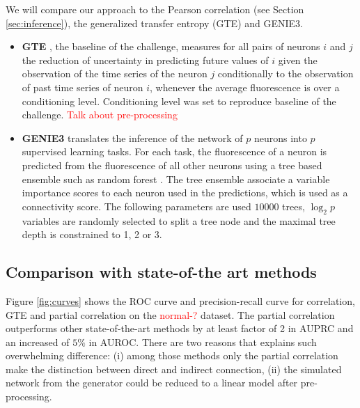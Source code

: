 \documentclass[wcp]{jmlr}
\begin{document}
We will compare our approach to the Pearson correlation (see Section
\ref{sec:inference}), the generalized transfer entropy (GTE) and GENIE3.
\begin{itemize}
\item \textbf{GTE} \citep{stetter2012model}
, the baseline of the challenge, measures for all pairs of
neurons $i$ and $j$ the reduction of uncertainty in predicting future values of
$i$ given the observation of the time series of the neuron $j$
conditionally to the observation of past time series of neuron $i$,
whenever the average fluorescence is over a conditioning level.
Conditioning level was set to reproduce baseline of the challenge.
\textcolor{red}{Talk about pre-processing}

\item \textbf{GENIE3} \citep{huynhthu2010inferring} translates the inference of the
network of $p$ neurons into $p$ supervised learning tasks. For each task,
the fluorescence of a neuron is predicted from the fluorescence
of all other neurons using a tree based ensemble such as
random forest \citep{breiman2001random}. The tree ensemble associate a
variable importance scores \citep{louppe2013understanding}
to each neuron used in the predictions, which is used as a connectivity
score. The following parameters are used
$10000$ trees, $\log_2{p}$ variables are randomly selected to split a tree
node and the maximal tree depth is constrained to 1, 2 or 3.
\end{itemize}


\subsection*{Comparison with state-of-the art methods}

Figure \ref{fig:curves} shows the ROC curve and precision-recall curve
for correlation, GTE and partial correlation on the \textcolor{red}{normal-?}
dataset. The partial correlation outperforms other state-of-the-art methods
by at least factor of 2 in AUPRC and an increased of $5\%$ in AUROC. There
are two reasons that explains such overwhelming difference: (i) among
those methods only the partial correlation make the distinction between
direct and indirect connection, (ii) the simulated network from the
\citep{stetter2012model} generator could be reduced to a linear model after
pre-processing.
\end{document}
